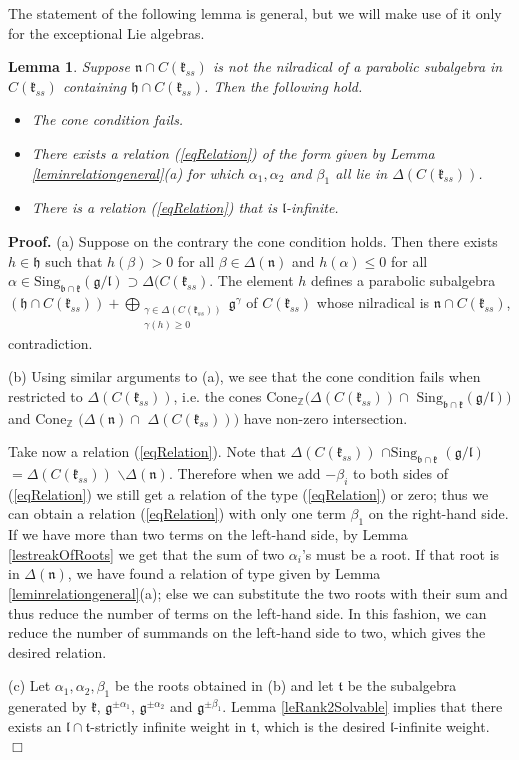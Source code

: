 \documentclass[12pt]{report}
\newtheorem{lemma}[theo]{Lemma}
\newenvironment{proof}[1][]{ \textbf{Proof#1. }}{$\Box$\medskip}
\newcommand {\ZZ} {\mathbb {Z}}
\newcommand{\tT}{\mathfrak{t}}
\newcommand{\kk}{\mathfrak{k}}
\newcommand{\nn}{\mathfrak{n}}
\newcommand{\hh}{\mathfrak{h}}
\newcommand{\gG}{\mathfrak{g}}
\newcommand{\bb}{\mathfrak{b}}
\newcommand{\lL}{\mathfrak{l}}
\newcommand{\refle}[1]{Lemma \ref{#1}}
\newcommand{\refeq}[1]{(\ref{#1})}
\newcommand{\Cone}{\mathrm{Cone}}
\newcommand{\hw}{\mathrm{Sing}}
\newcommand{\pma}{\pm}%
\begin{document}
The statement of the following lemma is general, but we will make use of it only for the exceptional Lie algebras.
\begin{lemma}\label{leCentralizerAndNilradical}
Suppose $\nn \cap C(\kk_{ss})$ is not the nilradical of a parabolic subalgebra in $C(\kk_{ss})$ containing $\hh\cap C(\kk_{ss})$. Then the following hold. 
\begin{itemize}
\item[(a)] The cone condition fails. 
\item[(b)] There exists a relation \refeq{eqRelation} of the form given by \refle{leminrelationgeneral}(a) for which $\alpha_1,\alpha_2$ and $\beta_1$ all lie in $\Delta(C(\kk_{ss}))$.  
\item[(c)] There is a relation \refeq{eqRelation} that is $\lL$-infinite.
\end{itemize}
\end{lemma}
\begin{proof}
(a) Suppose on the contrary the cone condition holds. Then there exists $h\in\hh$ such that $h(\beta)>0$ for all $\beta\in\Delta(\nn)$ and $h(\alpha)\leq 0$ for all $\alpha\in\hw_{\bb\cap\kk}(\gG/\lL) \supset \Delta(C(\kk_{ss})$. The element $h$ defines a parabolic subalgebra $(\hh\cap C(\kk_{ss}))+\bigoplus_{\substack{ \gamma\in\Delta(C(\kk_{ss})) \\ \gamma(h)\geq 0}}\gG^\gamma $ of  $C(\kk_{ss})$ whose nilradical is $\nn\cap C(\kk_{ss})$, contradiction. 

(b) Using similar arguments to (a), we see that the cone condition fails when restricted to $\Delta(C(\kk_{ss}))$, i.e. the cones $\Cone_{\ZZ} (\Delta(C(\kk_{ss}))\cap$ $\hw_{\bb\cap\kk}(\gG/\lL))$ and  $\Cone_{\ZZ}$ $(\Delta(\nn) \cap$ $\Delta (C(\kk_{ss})))$ have non-zero intersection. 

Take now a relation \refeq{eqRelation}. Note that $\Delta(C(\kk_{ss}))$ $\cap \hw_{\bb\cap\kk}$ $(\gG/\lL)$ $= \Delta( C(\kk_{ss}))$ $\backslash\Delta(\nn)$. Therefore when we add $-\beta_i$ to both sides of \refeq{eqRelation} we still get a relation of the type \refeq{eqRelation} or zero; thus we can obtain a relation \refeq{eqRelation} with only one term $\beta_1$ on the right-hand side. If we have more than two terms on the left-hand side, by \refle{lestreakOfRoots} we get that the sum of two $\alpha_i$'s must be a root. If that root is in $\Delta(\nn)$, we have found a relation of type given by \refle{leminrelationgeneral}(a); else we can substitute the two roots with their sum and thus reduce the number of terms on the left-hand side. In this fashion, we can reduce the number of summands on the left-hand side to two, which gives the desired relation.

(c) Let $\alpha_1,\alpha_2, \beta_1$ be the roots obtained in (b) and let $\tT$ be the subalgebra generated by $\kk$, $\gG^{\pma\alpha_1}$, $\gG^{\pma\alpha_2}$ and $\gG^{\pma\beta_1}$. Lemma \ref{leRank2Solvable} implies that there exists an $\lL\cap\tT$-strictly infinite weight in $\tT$, which is the desired $\lL$-infinite weight.
\end{proof}
\end{document}
